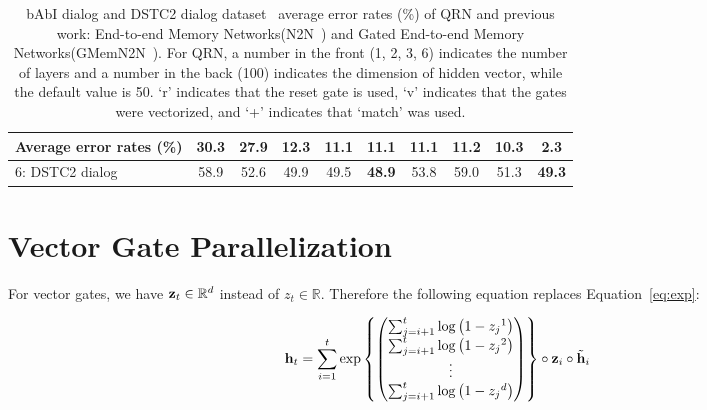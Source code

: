\documentclass[table]{article}
\begin{document}
\begin{table}[ht]
\begin{center}
{\begin{tabular}{|l||c|c|c|c|c|c||c|c|c|}
 \hline
 Average error rates (\%)                    & 30.3  & 27.9  & 12.3 & {\bf 11.1} & {\bf 11.1} &{\bf 11.1}  & 11.2  & 10.3  &{\bf 2.3} \\
 \hline
 \hline
 6: DSTC2 dialog                        & 58.9 & 52.6 & 49.9 & 49.5  &{\bf 48.9}  & 53.8  & 59.0  & 51.3  &{\bf 49.3}  \\
 \hline 
\end{tabular}
}
\end{center}
\caption{ \small bAbI dialog and DSTC2 dialog dataset~\citep{bordes2016learning} average error rates (\%) of QRN and previous work: End-to-end Memory Networks(N2N~\citep{bordes2016learning}) and Gated End-to-end Memory Networks(GMemN2N~\citep{perez2016gated}). For QRN, a number in the front (1, 2, 3, 6) indicates the number of layers and a number in the back (100) indicates the dimension of hidden vector, while the default value is 50. `r' indicates that the reset gate is used, `v' indicates that the gates were vectorized, and `+' indicates that `match' was used. }
\label{tab:dialog-all}
\end{table}









 
\section{Vector Gate Parallelization}\label{sec:app-b}

For vector gates, we have ${\bf z}_t \in \mathbb{R}^d$ instead of $z_t \in \mathbb{R}$. Therefore the following equation replaces Equation~\ref{eq:exp}:


\begin{equation}\label{eq:v-exp}
    {\bf h}_t 
    = \sum_{i=1}^{t} \exp \left \{
    \begin{pmatrix}
    \sum_{j=i+1}^{t} \log \left(1 - {z_j}^1 \right) \\
    \sum_{j=i+1}^{t} \log \left(1 - {z_j}^2 \right) \\
    \vdots \\
    \sum_{j=i+1}^{t} \log \left(1 - {z_j}^d \right)
    \end{pmatrix}
    \right
    \} \circ
    {\bf z}_i \circ
    \tilde{{\bf h}}_i
\end{equation}
\end{document}
